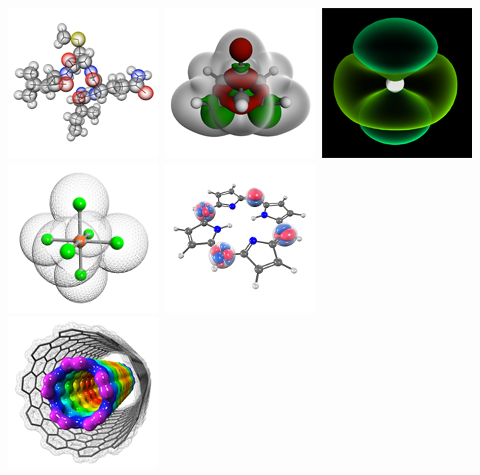 \documentclass[a4paper,12pt]{article}
\begin{document}
\begin{center}
\includegraphics[scale=0.58]{figures/gallery/g13_sm.png}\
\includegraphics[scale=0.58]{figures/gallery/g14_sm.png}\
\includegraphics[scale=0.58]{figures/gallery/g15_sm.png}\
\includegraphics[scale=0.58]{figures/gallery/g16_sm.png}\
\includegraphics[scale=0.58]{figures/gallery/g21_sm.png} \\
\includegraphics[scale=0.58]{figures/gallery/g10_sm.png}\

\end{center}
\end{document}
